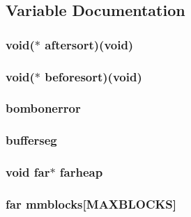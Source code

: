 \subsection{Variable Documentation}
\hypertarget{ID__MM_8C_ae0417d5723e6713c09a179a9c89b1f14}{
\subsubsection[{aftersort}]{\setlength{\rightskip}{0pt plus 5cm}void($\ast$  {\bf aftersort})(void)}}
\label{ID__MM_8C_ae0417d5723e6713c09a179a9c89b1f14}
\hypertarget{ID__MM_8C_a615c8b50b8f67f423250c0ac676a9809}{
\subsubsection[{beforesort}]{\setlength{\rightskip}{0pt plus 5cm}void($\ast$  {\bf beforesort})(void)}}
\label{ID__MM_8C_a615c8b50b8f67f423250c0ac676a9809}
\hypertarget{ID__MM_8C_aa0256f88979feb018bba721a5fcf118e}{
\subsubsection[{bombonerror}]{ {\bf bombonerror}}}
\label{ID__MM_8C_aa0256f88979feb018bba721a5fcf118e}
\hypertarget{ID__MM_8C_a08b9369ae972be8f272065cdf755c4f7}{
\subsubsection[{bufferseg}]{ {\bf bufferseg}}}
\label{ID__MM_8C_a08b9369ae972be8f272065cdf755c4f7}
\hypertarget{ID__MM_8C_af6225e828577deb78408396b668247b3}{
\subsubsection[{farheap}]{\setlength{\rightskip}{0pt plus 5cm}void far$\ast$ {\bf farheap}}}
\label{ID__MM_8C_af6225e828577deb78408396b668247b3}
\hypertarget{ID__MM_8C_ab30f9819af4fc84362a9a65dc7e75c92}{
\subsubsection[{mmblocks}]{ far {\bf mmblocks}\mbox{[}MAXBLOCKS\mbox{]}}}
